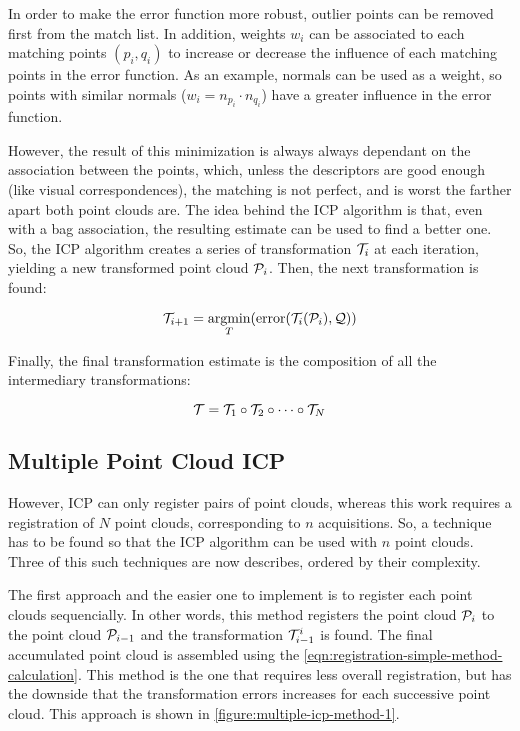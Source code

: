 In order to make the error function more robust, outlier points can be removed first from the match list. In addition, weights $w_i$ can be associated to each matching points $(p_i, q_i)$ to increase or decrease the influence of each matching points in the error function. As an example, normals can be used as a weight, so points with similar normals ($w_i = n_{p_i} \cdot n_{q_i}$) have a greater influence in the error function. 

However, the result of this minimization is always always dependant on the association between the points, which, unless the descriptors are good enough (like visual correspondences), the matching is not perfect, and is worst the farther apart both point clouds are. The idea behind the ICP algorithm is that, even with a bag association, the resulting estimate can be used to find a better one. So, the ICP algorithm creates a series of transformation $\mathcal{T}_i$ at each iteration, yielding a new transformed point cloud $\mathcal{P}_i$. Then, the next transformation is found:

\begin{equation}
    \mathcal{T}_{i+1} = \underset{T}{\textrm{argmin}}(\textrm{error}(\mathcal{T}_i(\mathcal{P}_i), \mathcal{Q}))
\end{equation}

Finally, the final transformation estimate is the composition of all the intermediary transformations:

\begin{equation}
    \mathcal{T} = \mathcal{T}_1 \circ \mathcal{T}_2 \circ \dots \circ \mathcal{T}_N
\end{equation}

\subsection{Multiple Point Cloud ICP}
\label{section:multiple-pointcloud-icp}

However, ICP can only register pairs of point clouds, whereas this work requires a registration of $N$ point clouds, corresponding to $n$ acquisitions. So, a technique has to be found so that the ICP algorithm can be used with $n$ point clouds. Three of this such techniques are now describes, ordered by their complexity.

The first approach and the easier one to implement is to register each point clouds sequencially. In other words, this method registers the point cloud $\mathcal{P}_i$ to the point cloud $\mathcal{P}_{i-1}$ and the transformation $\mathcal{T}_{i-1}^{i}$ is found. The final accumulated point cloud is assembled using the \cref{eqn:registration-simple-method-calculation}. This method is the one that requires less overall registration, but has the downside that the transformation errors increases for each successive point cloud. This approach is shown in \cref{figure:multiple-icp-method-1}.

